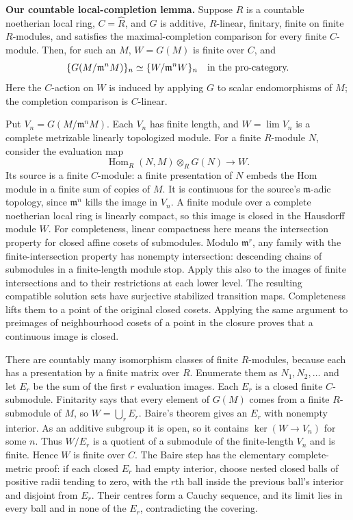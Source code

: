 \textbf{Our countable local-completion lemma.} Suppose $R$ is a
countable noetherian local ring, $C=\widehat R$, and $G$ is additive,
$R$-linear, finitary, finite on finite $R$-modules, and satisfies
the maximal-completion comparison for every finite $C$-module.
Then, for such an $M$, $W=G(M)$ is finite over $C$, and
\[
 \{G(M/\mathfrak m^nM)\}_n
 \simeq\{W/\mathfrak m^nW\}_n
 \quad\hbox{in the pro-category.}
\]
Here the $C$-action on $W$ is induced by applying $G$ to scalar
endomorphisms of $M$; the completion comparison is $C$-linear.

Put $V_n=G(M/\mathfrak m^nM)$. Each $V_n$ has finite length,
and $W=\lim V_n$ is a complete metrizable linearly topologized
module. For a finite $R$-module $N$, consider the evaluation map
\[
 \operatorname{Hom}_R(N,M)\otimes_R G(N)\longrightarrow W.
\]
Its source is a finite $C$-module: a finite presentation of $N$
embeds the Hom module in a finite sum of copies of $M$.
It is continuous for the source's $\mathfrak m$-adic topology,
since $\mathfrak m^n$ kills the image in $V_n$. A finite module
over a complete noetherian local ring is linearly compact, so this
image is closed in the Hausdorff module $W$. For completeness,
linear compactness here means the intersection property for closed
affine cosets of submodules. Modulo $\mathfrak m^r$, any family
with the finite-intersection property has nonempty intersection:
descending chains of submodules in a finite-length module stop.
Apply this also to the images of finite intersections and to their
restrictions at each lower level. The resulting compatible solution
sets have surjective stabilized transition maps. Completeness lifts
them to a point of the original closed cosets. Applying the same
argument to preimages of neighbourhood cosets of a point in the
closure proves that a continuous image is closed.

There are countably many isomorphism classes of finite $R$-modules,
because each has a presentation by a finite matrix over $R$.
Enumerate them as $N_1,N_2,\ldots$ and let $E_r$ be the sum
of the first $r$ evaluation images. Each $E_r$ is a closed finite
$C$-submodule. Finitarity says that every element of $G(M)$ comes
from a finite $R$-submodule of $M$, so $W=\bigcup_rE_r$.
Baire's theorem gives an $E_r$ with nonempty interior. As an
additive subgroup it is open, so it contains $\ker(W\to V_n)$
for some $n$. Thus $W/E_r$ is a quotient of a submodule of the
finite-length $V_n$ and is finite. Hence $W$ is finite over $C$.
The Baire step has the elementary complete-metric proof: if each
closed $E_r$ had empty interior, choose nested closed balls of
positive radii tending to zero, with the $r$th ball inside the
previous ball's interior and disjoint from $E_r$. Their centres
form a Cauchy sequence, and its limit lies in every ball and in
none of the $E_r$, contradicting the covering.

